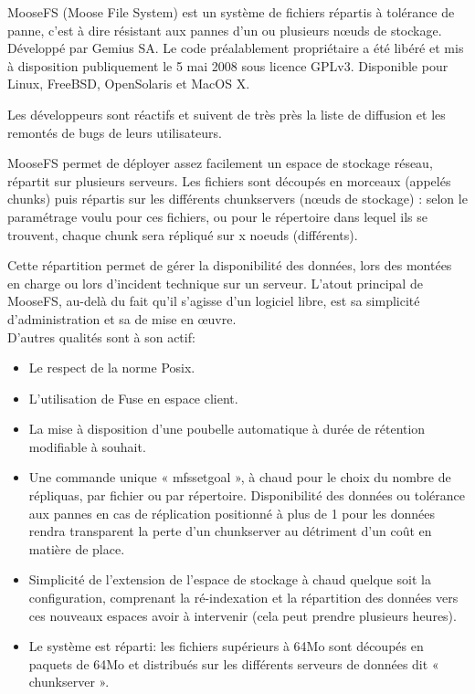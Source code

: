 \documentclass[12pt]{report}
\begin{document}
				
			MooseFS (Moose File System) est un système de fichiers répartis à tolérance de panne,
			c’est à dire résistant aux pannes d’un ou plusieurs nœuds de stockage.
			Développé par Gemius SA. Le code préalablement propriétaire a été libéré et mis à disposition publiquement le 5 mai 2008
			sous licence GPLv3. Disponible pour Linux, FreeBSD, OpenSolaris et MacOS X.

			Les développeurs sont réactifs et suivent de très près la liste de diffusion et les remontés de bugs de leurs utilisateurs.

			MooseFS permet de déployer assez facilement un espace de stockage réseau, répartit sur plusieurs serveurs. 
			Les fichiers sont découpés en morceaux (appelés chunks) puis répartis sur les différents chunkservers (nœuds de stockage) :
			selon le paramétrage voulu pour ces fichiers, ou pour le répertoire dans lequel ils se trouvent,
			chaque chunk sera répliqué sur x noeuds (différents).

			Cette répartition permet de gérer la disponibilité des données, lors des montées en charge ou lors d’incident technique
			sur un serveur. L'atout principal de MooseFS, au-delà du fait qu'il s’agisse d’un logiciel libre,
			est sa simplicité d'administration et sa de mise en œuvre.\\

			D'autres qualités sont à son actif:
			\begin{itemize}
                          \item Le respect de la norme Posix.
			  \item L'utilisation de Fuse en espace client.
			  \item La mise à disposition d'une poubelle automatique à durée de rétention modifiable à souhait.
			  \item Une commande unique « mfssetgoal », à chaud pour le choix du nombre de répliquas, par fichier ou par répertoire. Disponibilité des données ou tolérance aux pannes en cas de réplication positionné à plus de 1 pour les données rendra transparent la perte d'un chunkserver au détriment d'un coût en matière de place.
			  \item Simplicité de l'extension de l'espace de stockage à chaud quelque soit la configuration, comprenant la ré-indexation et la répartition des données vers ces nouveaux espaces avoir à intervenir (cela peut prendre plusieurs heures).
			  \item Le système est réparti: les fichiers supérieurs à 64Mo sont découpés en paquets de 64Mo et distribués sur les différents serveurs de données dit « chunkserver ».
                        \end{itemize}
\end{document}
